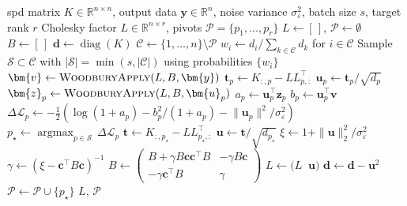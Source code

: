 \documentclass[onefignum,onetabnum]{siamart250211}
\DeclareMathOperator*{\argmax}{argmax}
\begin{document}
\begin{algorithm}[t]
\caption{\textsc{$\Delta$-VFE Pivoted Cholesky}}
\label{alg:vfe_batch_pc}
\begin{algorithmic}[1]
\REQUIRE spd matrix $K\in\mathbb{R}^{n\times n}$,
output data $\bm{y}\in\mathbb{R}^n$, noise variance $\sigma_\varepsilon^2$,
batch size $s$, target rank $r$
\ENSURE Cholesky factor $L\in\mathbb{R}^{n\times r}$, pivots $\mathcal{P}=\{p_1,\dots,p_r\}$
\STATE $L \leftarrow [\,]$, \quad $\mathcal{P} \leftarrow \emptyset$
\STATE $B \leftarrow [\,]$
\STATE $\bm{d} \leftarrow \operatorname{diag}(K)$
    \STATE $\mathcal{C} \leftarrow \{1,\dots,n\} \setminus \mathcal{P}$
    \STATE $w_i \leftarrow {d}_i / \sum_{k \in \mathcal{C}} {d}_k$ for $i \in \mathcal{C}$
    \STATE Sample $\mathcal{S} \subset \mathcal{C}$ with
    $|\mathcal{S}| = \min(s, |\mathcal{C}|)$ using probabilities $\{w_i\}$
    \STATE $\bm{v} \leftarrow \textsc{WoodburyApply}(L, B, \bm{y})$
        \STATE $\bm{t}_p \leftarrow K_{:,p} - L L_{p,:}^\top$
        \STATE $\bm{u}_p \leftarrow \bm{t}_p / \sqrt{d_p}$
        \STATE $\bm{z}_p \leftarrow \textsc{WoodburyApply}(L, B, \bm{u}_p)$
        \STATE $a_p \leftarrow \bm{u}_p^\top \bm{z}_p$
        \STATE $b_p \leftarrow \bm{u}_p^\top \bm{v}$
        \STATE $\Delta\mathcal{L}_p \leftarrow
        -\tfrac{1}{2}\!\left(
        \log(1 + a_p) - {b_p^2}/(1 + a_p) - {\|\bm{u}_p\|^2}/{\sigma_\varepsilon^{2}}
        \right)$
    \ENDFOR
    \STATE $p_\star \leftarrow \argmax_{p \in \mathcal{S}}\, \Delta\mathcal{L}_p$
    \STATE $\bm{t} \leftarrow K_{:,p_\star} - L L_{p_\star,:}^\top$
    \STATE $\bm{u} \leftarrow \bm{t} / \sqrt{d_{p_\star}}$
    \STATE $\xi \leftarrow 1 + \|\bm{u}\|_2^2/\sigma_\varepsilon^2$
    \STATE $\gamma \leftarrow \left(\xi - \bm{c}^\top B\bm{c}\right)^{-1}$
    \STATE $B \leftarrow
    \begin{pmatrix}
    B + \gamma B\bm{c}\bm{c}^\top B & -\gamma B\bm{c} \\
    -\gamma \bm{c}^\top B & \gamma
    \end{pmatrix}$
    \STATE $L \leftarrow \bigl(L \;\; \bm{u}\bigr)$
    \STATE $\bm{d} \leftarrow \bm{d} - \bm{u}^2$
    \STATE $\mathcal{P} \leftarrow \mathcal{P} \cup \{p_\star\}$
\ENDFOR
\RETURN $L, \, \mathcal{P}$
\end{algorithmic}
\end{algorithm}
\end{document}
